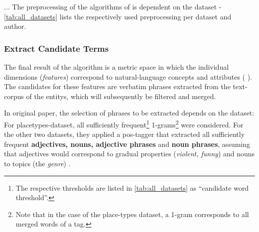 


... The preprocessing of the algorithms of \mainalgos is dependent on the dataset - \autoref{tab:all_datasets} lists the respectively used preprocessing per dataset and author.


\subsubsection{Extract Candidate Terms}
\label{sec:extract_cands}

The final result of the algorithm is a metric space in which the individual dimensions (\emph{\glspl{feature}}) correspond to natural-language concepts and attributes ( \cite{Derrac2015}). The candidates for these features are verbatim phrases extracted from the text-corpus of the \glspl{entity}, which will subsequently be filtered and merged.

In  original paper, the selection of phrases to be extracted depends on the dataset: For placetypes-dataset, all sufficiently frequent\footnote{\label{fnote:cand_thresholds}The respective thresholds are listed in \autoref{tab:all_datasets} as ``candidate word threshold''.} 1-grams\footnote{Note that in the case of the place-types dataset, a 1-gram corresponds to all merged words of a tag.} were considered. For the other two datasets, they applied a \gls{pos}-tagger that extracted all sufficiently frequent \textbf{adjectives, nouns, adjective phrases} and \textbf{noun phrases}, assuming that adjectives would correspond to gradual properties (\eg \textit{violent, funny}) and nouns to topics (\eg the \textit{genre}) \cite[Sec. 4.2.1]{Derrac2015}.

